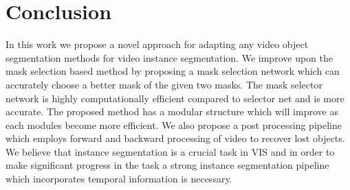 \documentclass[final]{cvpr}
\begin{document}
\section{Conclusion}

In this work we propose a novel approach for adapting any video object segmentation methods for video instance segmentation. We improve upon the mask selection based method by proposing a mask selection network which can accurately choose a better mask of the given two masks. The mask selector network is highly computationally efficient compared to selector net and is more accurate. The proposed method has a modular structure which will improve as each modules become more efficient. We also propose a post processing pipeline which employs forward and backward processing of video to recover lost objects. 
We believe that instance segmentation is a crucial task in VIS and in order to make significant progress in the task a strong instance segmentation pipeline which incorporates temporal information is necessary. 




{\small


}
\end{document}
